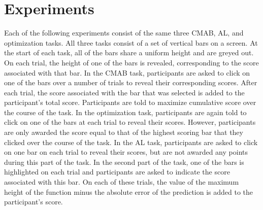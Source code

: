 \documentclass[10pt,letterpaper]{article}
\begin{document}
		 
	\section{Experiments}
		
		Each of the following experiments consist of the same three CMAB, AL, and optimization tasks. All three tasks consist of a set of vertical bars on a screen. At the start of each task, all of the bars share a uniform height and are greyed out. On each trial, the height of one of the bars is revealed, corresponding to the score associated with that bar. In the CMAB task, participants are asked to click on one of the bars over a number of trials to reveal their corresponding scores. After each trial, the score associated with the bar that was selected is added to the participant's total score. Participants are told to maximize cumulative score over the course of the task. In the optimization task, participants are again told to click on one of the bars at each trial to reveal their scores. However, participants are only awarded the score equal to that of the highest scoring bar that they clicked over the course of the task. In the AL task, participants are asked to click on one bar on each trial to reveal their scores, but are not awarded any points during this part of the task. In the second part of the task, one of the bars is highlighted on each trial and participants are asked to indicate the score associated with this bar. On each of these trials, the value of the maximum height of the function minus the absolute error of the prediction is added to the participant's score.
		
\end{document}
